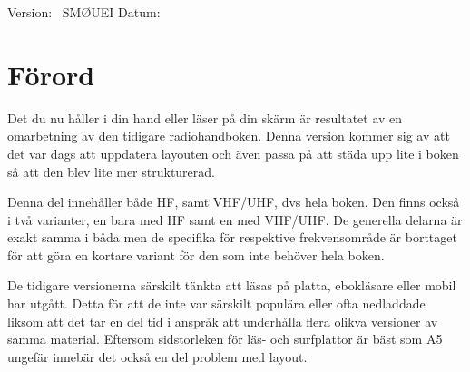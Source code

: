 	\vfill
	
	Version: \DokVersion\ \hfill SMØUEI \hfill Datum: \DokumentDatum
	
	\newpage
	
	
	\pagestyle{fancy}
	\lhead{\leftmark}	
	
	\chead{}
	
	
	\cfoot{\scriptsize \thepage\ / \pageref{LastPage}}
	
	
	\renewcommand{\footrulewidth}{0.2pt}
	
	
	
	\cleardoublepage
	
	\tableofcontents
	
	\newpage
	
	\setlength{\parskip}{0.5em}
	\setlength{\parindent}{0pt}

\section*{Förord}

Det du nu håller i din hand eller läser på din skärm är resultatet av
en omarbetning av den tidigare radiohandboken. Denna version kommer
sig av att det var dags att uppdatera layouten och även passa på att
städa upp lite i boken så att den blev lite mer strukturerad.

Denna del innehåller både HF, samt VHF/UHF, dvs hela boken. Den finns
också i två varianter, en bara med HF samt en med VHF/UHF. De
generella delarna är exakt samma i båda men de specifika för
respektive frekvensområde är borttaget för att göra en kortare variant
för den som inte behöver hela boken.

De tidigare versionerna särskilt tänkta att läsas på platta,
ebokläsare eller mobil har utgått. Detta för att de inte var särskilt
populära eller ofta nedladdade liksom att det tar en del tid i anspråk
att underhålla flera olikva versioner av samma material. Eftersom
sidstorleken för läs- och surfplattor är bäst som A5 ungefär innebär
det också en del problem med layout.

